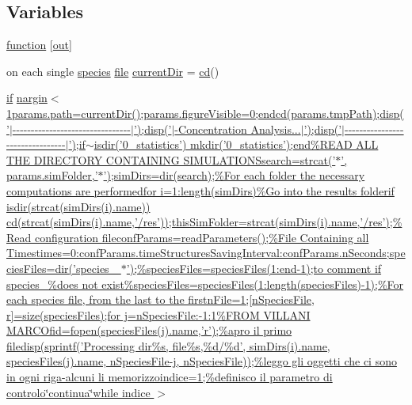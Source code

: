 \subsection*{Variables}
\begin{DoxyCompactItemize}
\item 
\hyperlink{a00025_a370f3dd25136a73d619eba0aa2e3bb4b}{function} \mbox{[}\hyperlink{a00028_a34c820385e9209f49c18739329ad9206}{out}\mbox{]}
\item 
on each single \hyperlink{a00021}{species} \hyperlink{a00110_a4e8353d6c62cf54bf4a1a8f63e56b8c3}{file} \hyperlink{a00025_afb60cd67e28ca8c9fa44e4f5452589b9}{current\+Dir} = \hyperlink{a00113_abe327856a9ee2f30f3ccafe4dc9edf5e}{cd}()
\item 
\hyperlink{a00030_a01d55766b8058903dd360b4bda71f9f5}{if} \hyperlink{a00025_a389644115bfaaa246f363dc22d48bf07}{nargin$<$ 1params.\+path=current\+Dir();params.\+figure\+Visible=0;endcd(params.\+tmp\+Path);disp('$\vert$-\/-\/-\/-\/-\/-\/-\/-\/-\/-\/-\/-\/-\/-\/-\/-\/-\/-\/-\/-\/-\/-\/-\/-\/-\/-\/-\/-\/-\/-\/-\/-\/$\vert$');disp('$\vert$-\/\+Concentration Analysis...$\vert$');disp('$\vert$-\/-\/-\/-\/-\/-\/-\/-\/-\/-\/-\/-\/-\/-\/-\/-\/-\/-\/-\/-\/-\/-\/-\/-\/-\/-\/-\/-\/-\/-\/-\/-\/$\vert$');if$\sim$isdir('0\+\_\+statistics') mkdir('0\+\_\+statistics');end\%\+R\+E\+A\+D A\+L\+L T\+H\+E D\+I\+R\+E\+C\+T\+O\+R\+Y C\+O\+N\+T\+A\+I\+N\+I\+N\+G S\+I\+M\+U\+L\+A\+T\+I\+O\+N\+Ssearch=strcat('$\ast$', params.\+sim\+Folder,'$\ast$');sim\+Dirs=dir(search);\%\+For each folder the necessary computations are performedfor i=1\+:length(sim\+Dirs)\%\+Go into the results folderif isdir(strcat(sim\+Dirs(i).\+name)) cd(strcat(sim\+Dirs(i).\+name,'/res'));this\+Sim\+Folder=strcat(sim\+Dirs(i).\+name,'/res');\%\+Read configuration fileconf\+Params=read\+Parameters();\%\+File Containing all Timestimes=0\+:conf\+Params.\+time\+Structures\+Saving\+Interval\+:conf\+Params.\+n\+Seconds;species\+Files=dir('species\+\_\+ $\ast$');\%species\+Files=species\+Files(1\+:end-\/1);to comment if species\+\_\%does not exist\%species\+Files=species\+Files(1\+:length(species\+Files)-\/1);\%\+For each species file, from the last to the firstn\+File=1;\mbox{[}n\+Species\+File, r\mbox{]}=size(species\+Files);for j=n\+Species\+File\+:-\/1\+:1\%\+F\+R\+O\+M V\+I\+L\+L\+A\+N\+I M\+A\+R\+C\+Ofid=fopen(species\+Files(j).\+name,'r');\%apro il primo filedisp(sprintf('\+Processing dir\%s, file\%s,\%d/\%d', sim\+Dirs(i).\+name, species\+Files(j).\+name, n\+Species\+File-\/j, n\+Species\+File));\%leggo gli oggetti che ci sono in ogni riga-\/alcuni li memorizzoindice=1;\%definisco il parametro di controlo\char`\"{}continua\char`\"{}while indice $>$}

\end{DoxyCompactItemize}
